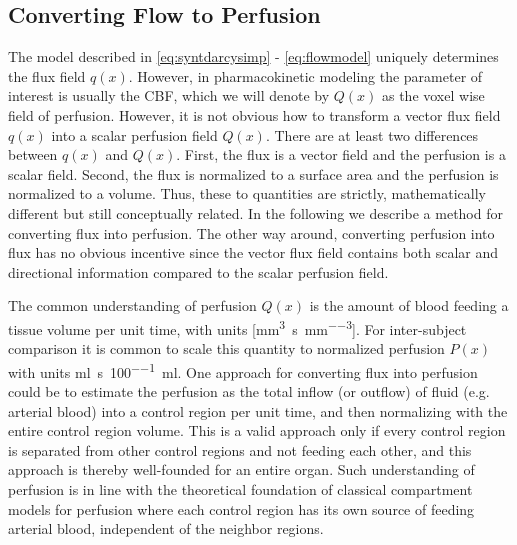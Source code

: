 \documentclass[paper=a4, fontsize=11pt,parskip=half,headings=small]{scrartcl}
\newcommand{\Perf}{Q}
\newcommand{\Perfn}{P}
\newcommand{\siQmm}{\milli\meter\cubed\per\second\per\milli\meter\cubed}
\newcommand{\siPml}{\milli\litre\per\second\per100\milli\litre}
\begin{document}
	
	
	\subsection{Converting Flow to Perfusion}\label{sec:flux2perf}
	The model described in \eqref{eq:syntdarcysimp} - \eqref{eq:flowmodel} uniquely determines the flux field $q(x)$. 
	However, in pharmacokinetic modeling the parameter of interest is usually the CBF, which we will denote by $\Perf (x)$ as the voxel wise field of perfusion. However, 
	it is not obvious how to transform a vector flux field $q(x)$ into a scalar perfusion field $\Perf (x)$.
	There are at least two differences between $q(x)$ and $\Perf (x)$. 
	First, the flux is a vector field and the perfusion is a scalar field. 
	Second, the flux is normalized to a surface area and the perfusion is normalized to a volume. 
	Thus, these to quantities are strictly, mathematically different but still conceptually related. 
	In the following we describe a method for converting flux into perfusion. The other way around, converting perfusion into flux has no obvious incentive since the vector flux field contains both scalar and directional information compared to the scalar perfusion field.

	The common understanding of perfusion $\Perf (x)$ is the amount of blood feeding a tissue volume per unit time, with units [\si{\siQmm}]. 
	For inter-subject comparison it is common to scale this quantity to normalized perfusion $\Perfn (x)$ with units \si{\siPml}. 
	One approach for converting flux into perfusion could be to estimate the perfusion as the total inflow (or outflow) of fluid (e.g. arterial blood) into a control region per unit time, and then normalizing with the entire control region volume. 
	This is a valid approach only if every control region is separated from other control regions and not feeding each other, and this approach is thereby well-founded 
	for an entire organ. 
	Such understanding of perfusion is in line with the theoretical foundation of classical compartment models for perfusion where each control region has its own source of feeding arterial blood, independent of the neighbor regions. 
	
\end{document}
